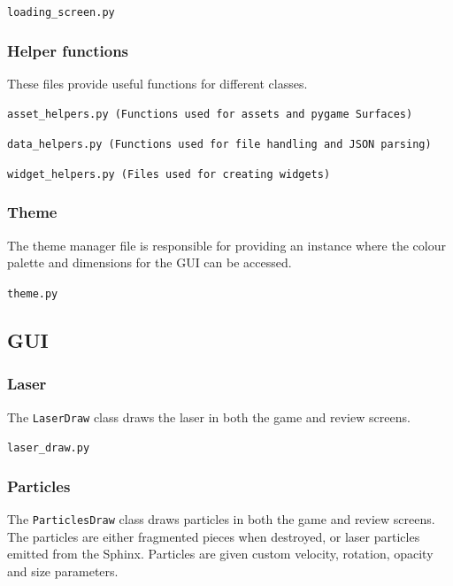 \documentclass[../main/main.tex]{subfiles}
\begin{document}
\noindent\verb|loading_screen.py|


\subsubsection{Helper functions}
These files provide useful functions for different classes.

\label{sec:asset-helpers}
\noindent\verb|asset_helpers.py (Functions used for assets and pygame Surfaces)|


\bigskip
\label{sec:data-helpers}
\noindent\verb|data_helpers.py (Functions used for file handling and JSON parsing)|


\bigskip
\noindent\verb|widget_helpers.py (Files used for creating widgets)|


\subsubsection{Theme}
\label{sec:theme}
The theme manager file is responsible for providing an instance where the colour palette and dimensions for the GUI can be accessed.

\noindent\verb|theme.py|


\subsection{GUI}
\subsubsection{Laser}
The \lstinline{LaserDraw} class draws the laser in both the game and review screens.

\noindent\verb|laser_draw.py|


\subsubsection{Particles}
The \lstinline{ParticlesDraw} class draws particles in both the game and review screens. The particles are either fragmented pieces when destroyed, or laser particles emitted from the Sphinx. Particles are given custom velocity, rotation, opacity and size parameters.
\end{document}
